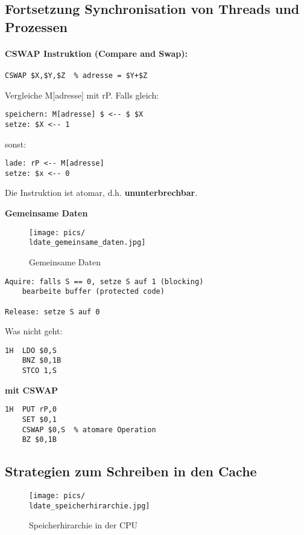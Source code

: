 \renewcommand{\ldate}{2015-05-27}	%
\fancyfoot[R]{\tiny{SS 2015 / \ldate}}


\subsection{Fortsetzung Synchronisation von Threads und Prozessen}

\paragraph{CSWAP Instruktion (Compare and Swap):}

\begin{lstlisting}
CSWAP $X,$Y,$Z	% adresse = $Y+$Z
\end{lstlisting}

Vergleiche M[adresse] mit rP. 
Falls gleich:  
\begin{lstlisting}
speichern: M[adresse] $ <-- $ $X
setze: $X <-- 1
\end{lstlisting}
sonst:
\begin{lstlisting}
lade: rP <-- M[adresse]
setze: $x <-- 0
\end{lstlisting}
Die Instruktion ist atomar, d.h. \textbf{ununterbrechbar}.

\textbf{Gemeinsame Daten}

\begin{figure}[htbp]
\texttt{[image: pics/\\ldate\_gemeinsame\_daten.jpg]}
\caption{Gemeinsame Daten}
\label{fig:gemeinsame_daten}
\end{figure}

\begin{lstlisting}
Aquire:	falls S == 0, setze S auf 1 (blocking)
	bearbeite buffer (protected code)

Release: setze S auf 0
\end{lstlisting}
Was nicht geht:
\begin{lstlisting}
1H	LDO $0,S
	BNZ $0,1B	
	STCO 1,S
\end{lstlisting}

\textbf{mit CSWAP}
\begin{lstlisting}
1H	PUT rP,0
	SET $0,1
	CSWAP $0,S	% atomare Operation
	BZ $0,1B
\end{lstlisting}


\subsection{Strategien zum Schreiben in den Cache}
\begin{figure}[htbp]
\texttt{[image: pics/\\ldate\_speicherhirarchie.jpg]}
\caption{Speicherhirarchie in der CPU}
\label{fig:speicherhirarchie}
\end{figure}

